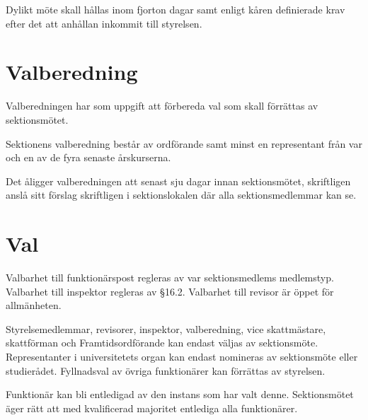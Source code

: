 \documentclass[stadgar]{dsekprotokoll}
\begin{document}
\begin{stadgeavsnitt}
Dylikt möte skall hållas inom fjorton dagar samt enligt kåren definierade krav efter det att anhållan inkommit till styrelsen.


\end{stadgeavsnitt}

\section{Valberedning}

\begin{stadgeavsnitt}


Valberedningen har som uppgift att förbereda val som skall förrättas av
sektionsmötet.


Sektionens valberedning består av ordförande samt minst en representant
från var och en av de fyra senaste årskurserna.


Det åligger valberedningen att senast sju dagar innan sektionsmötet, skriftligen anslå sitt förslag skriftligen i sektionslokalen där alla sektionsmedlemmar kan se.

\end{stadgeavsnitt}

\section{Val}

\begin{stadgeavsnitt}


Valbarhet till funktionärspost regleras av var sektionsmedlems
medlemstyp. Valbarhet till inspektor regleras av \S16.2. Valbarhet till revisor är öppet för
allmänheten.


Styrelsemedlemmar, revisorer, inspektor, valberedning, vice skattmästare, skattförman och Framtidsordförande kan endast väljas av sektionsmöte. Representanter i universitetets organ kan endast nomineras av sektionsmöte eller studierådet. Fyllnadsval av övriga
funktionärer kan förrättas av styrelsen.




Funktionär kan bli entledigad av den instans som har valt denne. Sektionsmötet äger rätt
att med kvalificerad majoritet entlediga alla funktionärer.

\end{stadgeavsnitt}
\end{document}
